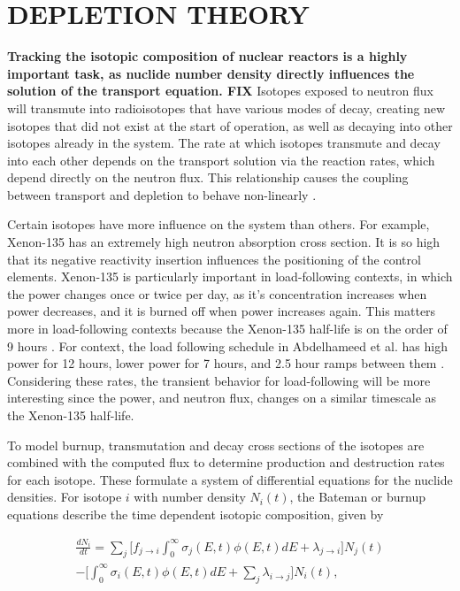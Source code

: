 \documentclass[letterpaper]{physor2024}
\begin{document}
\section{DEPLETION THEORY}\label{sec:depletion}
\textbf{Tracking the isotopic composition of nuclear reactors is a highly important task, as nuclide number density directly influences the solution of the transport equation. FIX} Isotopes exposed to neutron flux will transmute into radioisotopes that have various modes of decay, creating new isotopes that did not exist at the start of operation, as well as decaying into other isotopes already in the system. The rate at which isotopes transmute and decay into each other depends on the transport solution via the reaction rates, which depend directly on the neutron flux. This relationship causes the coupling between transport and depletion to behave non-linearly \cite{romano-depletion-2021}.

Certain isotopes have more influence on the system than others. For example, Xenon-135 has an extremely high neutron absorption cross section. It is so high that its negative reactivity insertion influences the positioning of the control elements. Xenon-135 is particularly important in load-following contexts, in which the power changes once or twice per day, as it's concentration increases when power decreases, and it is burned off when power increases again. This matters more in load-following contexts because the Xenon-135 half-life is on the order of 9 hours \cite{d-and-h}. For context, the load following schedule in Abdelhameed et al. has high power for 12 hours, lower power for 7 hours, and 2.5 hour ramps between them \cite{Abdelhameed-ANS-2022}. Considering these rates, the transient behavior for load-following will be more interesting since the power, and neutron flux, changes on a similar timescale as the Xenon-135 half-life.

To model burnup, transmutation and decay cross sections of the isotopes are combined with the computed flux to determine production and destruction rates for each isotope. These formulate a system of differential equations for the nuclide densities. For isotope $i$ with number density $N_{i}(t)$, the Bateman or burnup equations describe the time dependent isotopic composition, given by

\begin{multline} \label{eq:batemen}
    \frac{dN_{i}}{dt} =
    \sum_{j} \bigg[f_{j\rightarrow{i}}\int_{0}^{\infty} \sigma_{j}(E,t)\phi(E,t)dE + \lambda_{j\rightarrow{i}}\bigg]N_{j}(t) \\
    -\bigg[\int_{0}^{\infty} \sigma_{i}(E,t)\phi(E,t)dE
    +\sum_{j}\lambda_{i\rightarrow{j}}\bigg] N_{i}(t),
\end{multline}
\end{document}
